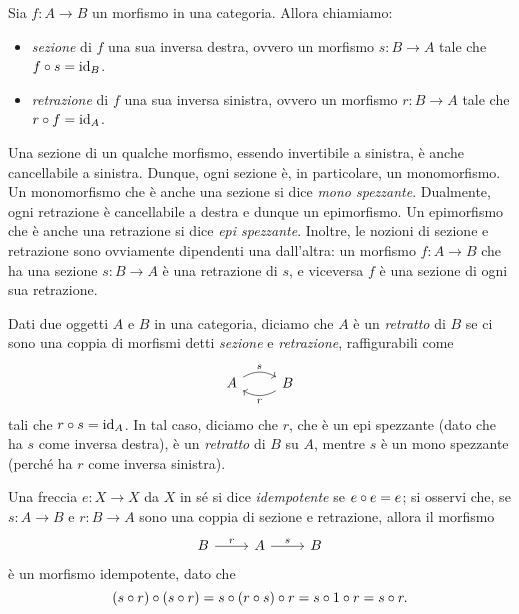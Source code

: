 \begin{definition}
	Sia \(f \colon A \to B\) un morfismo in una categoria.
	Allora chiamiamo:
	\begin{itemize}
		\item \emph{sezione} di \(f\) una sua inversa destra, ovvero un morfismo \(s \colon B \to A\) tale che \(f \circ s = \mathrm{id}_{B}\).
		\item \emph{retrazione} di \(f\) una sua inversa sinistra, ovvero un morfismo \(r \colon B \to A\) tale che \(r \circ f = \mathrm{id}_{A}\).
	\end{itemize}
\end{definition}
\begin{definition}
	Una sezione di un qualche morfismo, essendo invertibile a sinistra, è anche cancellabile a sinistra.
	Dunque, ogni sezione è, in particolare, un monomorfismo.
	Un monomorfismo che è anche una sezione si dice \emph{mono spezzante}.
	Dualmente, ogni retrazione è cancellabile a destra e dunque un epimorfismo.
	Un epimorfismo che è anche una retrazione si dice \emph{epi spezzante}.
	Inoltre, le nozioni di sezione e retrazione sono ovviamente dipendenti una dall'altra:
	un morfismo \(f : A \to B\) che ha una sezione \(s : B\to A\) è una retrazione di \(s\),
	e viceversa \(f\) è una sezione di ogni sua retrazione.
\end{definition}
\begin{definition}[Retratto]
	Dati due oggetti \(A\) e \(B\) in una categoria,
	diciamo che \(A\) è un \emph{retratto} di \(B\) se ci sono una coppia di morfismi detti \emph{sezione} e \emph{retrazione}, raffigurabili come
	\begin{equation}
		\begin{tikzcd}
			A \ar[r, bend left, "s"] &B \ar[l, bend left, "r"]
		\end{tikzcd}
	\end{equation}
	tali che \(r \circ s = \mathrm{id}_A\).
	In tal caso, diciamo che \(r\), che è un epi spezzante (dato che ha \(s\) come inversa destra), è un \emph{retratto} di \(B\) su \(A\), mentre \(s\) è un mono spezzante (perché ha \(r\) come inversa sinistra).
\end{definition}
\begin{remark}
	Una freccia \(e : X\to X\) da \(X\) in sé si dice \emph{idempotente} se \(e\circ e=e\); si osservi che, se \(s \colon A \to B\) e \(r \colon B \to A\) sono una coppia di sezione e retrazione,
	allora il morfismo
	\begin{equation}
		\begin{tikzcd}
			B \ar[r, "r"] & A \ar[r, "s"] &B
		\end{tikzcd}
	\end{equation}
	è un morfismo idempotente, dato che
	\[(s\circ r)\circ (s\circ r) = s\circ (r\circ s)\circ r = s\circ 1\circ r=s\circ r.\]
\end{remark}

